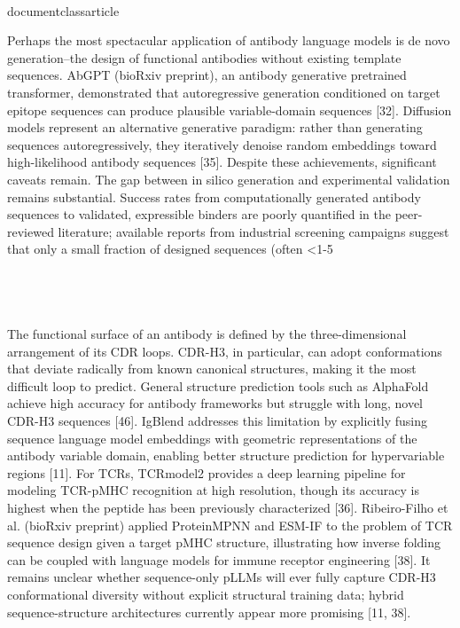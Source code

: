 \\documentclass{article}
\begin{document}
Perhaps the most spectacular application of antibody language models is de novo generation--the design of functional antibodies without existing template sequences. AbGPT (bioRxiv preprint), an antibody generative pretrained transformer, demonstrated that autoregressive generation conditioned on target epitope sequences can produce plausible variable-domain sequences [32]. Diffusion models represent an alternative generative paradigm: rather than generating sequences autoregressively, they iteratively denoise random embeddings toward high-likelihood antibody sequences [35]. Despite these achievements, significant caveats remain. The gap between in silico generation and experimental validation remains substantial. Success rates from computationally generated antibody sequences to validated, expressible binders are poorly quantified in the peer-reviewed literature; available reports from industrial screening campaigns suggest that only a small fraction of designed sequences (often <1-5\\%

\subsection{}

The functional surface of an antibody is defined by the three-dimensional arrangement of its CDR loops. CDR-H3, in particular, can adopt conformations that deviate radically from known canonical structures, making it the most difficult loop to predict. General structure prediction tools such as AlphaFold achieve high accuracy for antibody frameworks but struggle with long, novel CDR-H3 sequences [46]. IgBlend addresses this limitation by explicitly fusing sequence language model embeddings with geometric representations of the antibody variable domain, enabling better structure prediction for hypervariable regions [11]. For TCRs, TCRmodel2 provides a deep learning pipeline for modeling TCR-pMHC recognition at high resolution, though its accuracy is highest when the peptide has been previously characterized [36]. Ribeiro-Filho et al. (bioRxiv preprint) applied ProteinMPNN and ESM-IF to the problem of TCR sequence design given a target pMHC structure, illustrating how inverse folding can be coupled with language models for immune receptor engineering [38]. It remains unclear whether sequence-only pLLMs will ever fully capture CDR-H3 conformational diversity without explicit structural training data; hybrid sequence-structure architectures currently appear more promising [11, 38].
\end{document}
